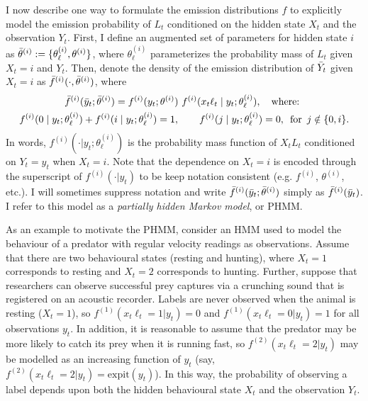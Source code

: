 I now describe one way to formulate the emission distributions $f$ to explicitly model the emission probability of $L_t$ conditioned on the hidden state $X_t$ and the observation $Y_t$. First, I define an augmented set of parameters for hidden state $i$ as $\bar{\theta}^{(i)} := \{\theta^{(i)}_{\ell},\theta^{(i)}\}$, where $\theta^{(i)}_{\ell}$ parameterizes the probability mass of $L_t$ given $X_t = i$ and $Y_t$.  Then, denote the density of the emission distribution of $\bar{Y}_t$ given $X_t = i$ as $\bar{f}^{(i)}(\cdot,\bar{\theta}^{(i)})$, where
%
\begin{gather}
    \bar{f}^{(i)}(\bar{y}_t;\bar{\theta}^{(i)}) = f^{(i)}(y_t;\theta^{(i)}) ~ f^{(i)}(x_t\ell_t \mid y_t;\theta^{(i)}_{\ell})
    \label{eqn:PHMM_emis}, \quad \text{where: } \\
    f^{(i)}(0 \mid y_t;\theta^{(i)}_{\ell}) + f^{(i)}(i \mid y_t;\theta^{(i)}_{\ell}) = 1, \qquad f^{(i)}(j \mid y_t;\theta^{(i)}_{\ell}) = 0, \enspace \text{for} \enspace j \notin \{0,i\}. \nonumber
\end{gather}
%
In words, $f^{(i)}(\cdot|y_t;\theta^{(i)}_{\ell})$ is the probability mass function of $X_t L_t$ conditioned on $Y_t = y_t$ when $X_t = i$. Note that the dependence on $X_t = i$ is encoded through the superscript of $f^{(i)}(\cdot|y_t)$ to be keep notation consistent (e.g. $f^{(i)}$, $\theta^{(i)}$, etc.). I will sometimes suppress notation and write $\bar{f}^{(i)}(\bar{y}_t;\bar{\theta}^{(i)})$ simply as $\bar{f}^{(i)}(\bar{y}_t)$. %
I refer to this model as a \textit{partially hidden Markov model}, or PHMM. 

As an example to  motivate the PHMM, consider an HMM used to model the behaviour of a predator with regular velocity readings as observations. Assume that there are two behavioural states (resting and hunting), where $X_t = 1$ corresponds to resting and $X_t = 2$ corresponds to hunting. Further, suppose that researchers can observe successful prey captures via a crunching sound that is registered on an acoustic recorder. Labels are never observed when the animal is resting ($X_t = 1$), so $f^{(1)}(x_t\ell_t = 1|y_t) = 0$ and $f^{(1)}(x_t\ell_t = 0|y_t) = 1$ for all observations $y_t$. 
In addition, it is reasonable to assume that the predator may be more likely to catch its prey when it is running fast, so $f^{(2)}(x_t\ell_t = 2|y_t)$ may be modelled as an increasing function of $y_t$ (say, $f^{(2)}(x_t\ell_t = 2|y_t) = \text{expit}(y_t)$). In this way, the probability of observing a label depends upon both the hidden behavioural state $X_t$ and the observation $Y_t$.

